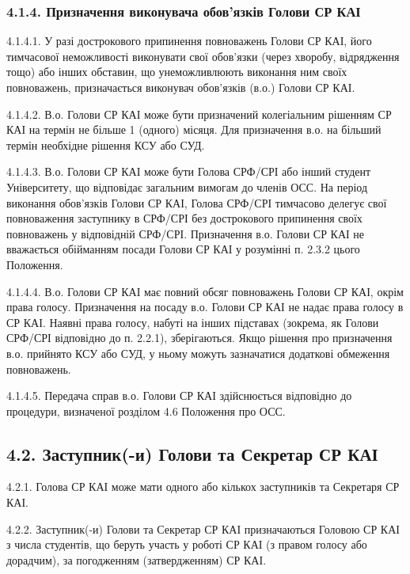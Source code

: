     \subsubsection*{4.1.4. Призначення виконувача обов'язків Голови СР КАІ}
        4.1.4.1. У разі дострокового припинення повноважень Голови СР КАІ, його тимчасової неможливості виконувати свої обов'язки (через хворобу, відрядження тощо) або інших обставин, що унеможливлюють виконання ним своїх повноважень, призначається виконувач обов'язків (в.о.) Голови СР КАІ.
        
        4.1.4.2. В.о. Голови СР КАІ може бути призначений колегіальним рішенням СР КАІ на термін не більше 1 (одного) місяця. Для призначення в.о. на більший термін необхідне рішення КСУ або СУД.
        
        4.1.4.3. В.о. Голови СР КАІ може бути Голова СРФ/СРІ або інший студент Університету, що відповідає загальним вимогам до членів ОСС. На період виконання обов'язків Голови СР КАІ, Голова СРФ/СРІ тимчасово делегує свої повноваження заступнику в СРФ/СРІ без дострокового припинення своїх повноважень у відповідній СРФ/СРІ. Призначення в.о. Голови СР КАІ не вважається обійманням посади Голови СР КАІ у розумінні п. 2.3.2 цього Положення.
        
        4.1.4.4. В.о. Голови СР КАІ має повний обсяг повноважень Голови СР КАІ, окрім права голосу. Призначення на посаду в.о. Голови СР КАІ не надає права голосу в СР КАІ. Наявні права голосу, набуті на інших підставах (зокрема, як Голови СРФ/СРІ відповідно до п. 2.2.1), зберігаються. Якщо рішення про призначення в.о. прийнято КСУ або СУД, у ньому можуть зазначатися додаткові обмеження повноважень.
        
        4.1.4.5. Передача справ в.о. Голови СР КАІ здійснюється відповідно до процедури, визначеної розділом 4.6 Положення про ОСС.

\subsection*{4.2. Заступник(-и) Голови та Секретар СР КАІ}
    4.2.1. Голова СР КАІ може мати одного або кількох заступників та Секретаря СР КАІ.

    4.2.2. Заступник(-и) Голови та Секретар СР КАІ призначаються Головою СР КАІ з числа студентів, що беруть участь у роботі СР КАІ (з правом голосу або дорадчим), за погодженням (затвердженням) СР КАІ.

